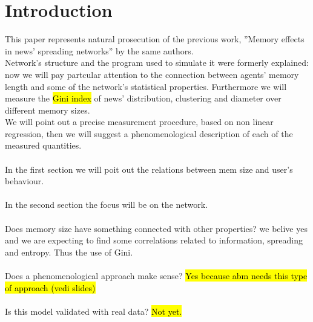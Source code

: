 \section{Introduction}
This paper represents natural prosecution of the previous work,
''Memory effects in news' spreading networks'' by the same authors.\\
Network's structure and the program used to simulate it were
formerly explained: now we will pay partcular attention to
the connection between agents' memory length  and some of the
network's statistical properties.
Furthermore we will measure the \hl{Gini index} of news' distribution,
clustering and diameter over different memory sizes.\\
We will point out a precise measurement procedure, based on non linear
regression, then we will suggest a phenomenological description of
each of the measured quantities.\\ \\
In the first section we will poit out the relations between mem size
and user's behaviour. \\ \\
In the second section the focus will be on the network.\\ \\
Does memory size have something connected with other properties?
we belive yes and we are expecting to find some correlations related
to information, spreading and entropy. Thus the use of Gini.\\ \\
Does a phenomenological approach make sense? \hl{Yes because abm needs
this type of approach (vedi slides)}\\ \\
Is this model validated with real data? \hl{Not yet.}